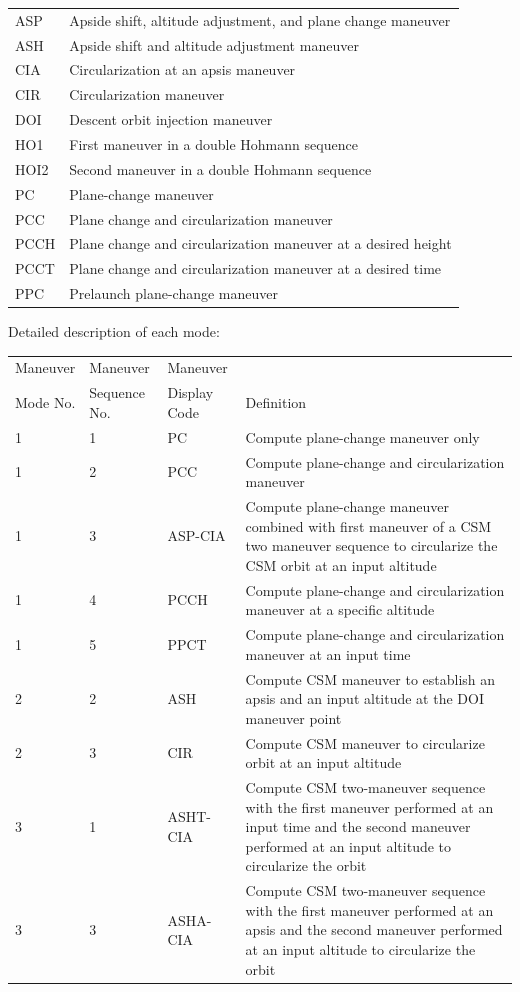 \documentclass[11pt]{article} %
\begin{document}
\begin{center}
\begin{tabular}{l l}
ASP&Apside shift, altitude adjustment, and plane change maneuver\\
ASH&Apside shift and altitude adjustment maneuver\\
CIA&Circularization at an apsis maneuver\\
CIR&Circularization maneuver\\
DOI&Descent orbit injection maneuver\\
HO1&First maneuver in a double Hohmann sequence\\
HOI2&Second maneuver in a double Hohmann sequence\\
PC&Plane-change maneuver\\
PCC&Plane change and circularization maneuver\\
PCCH&Plane change and circularization maneuver at a desired height\\
PCCT&Plane change and circularization maneuver at a desired time\\
PPC&Prelaunch plane-change maneuver\\
\end{tabular}
\end{center}
\newpage
Detailed description of each mode:\\
\begin{center}
\begin{tabular}{l l l m{7.3cm}}
Maneuver&Maneuver&Maneuver&\\
Mode No.&Sequence No.&Display Code& Definition\\
\hline
1&1&PC&Compute plane-change maneuver only\\
\hline
1&2&PCC&Compute plane-change and circularization maneuver\\
\hline
1&3&ASP-CIA&Compute plane-change maneuver combined with first maneuver of a CSM two maneuver sequence to circularize the CSM orbit at an input altitude\\
\hline
1&4&PCCH&Compute plane-change and circularization maneuver at a specific altitude\\
\hline
1&5&PPCT&Compute plane-change and circularization maneuver at an input time\\
\hline
2&2&ASH&Compute CSM maneuver to establish an apsis and an input altitude at the DOI maneuver point\\
\hline
2&3&CIR&Compute CSM maneuver to circularize orbit at an input altitude\\
\hline
3&1&ASHT-CIA&Compute CSM two-maneuver sequence with the first maneuver performed at an input time and the second maneuver performed at an input altitude to circularize the orbit\\
\hline
3&3&ASHA-CIA&Compute CSM two-maneuver sequence with the first maneuver performed at an apsis and the second maneuver performed at an input altitude to circularize the orbit\\
\hline
\end{tabular}
\end{center}
\end{document}
